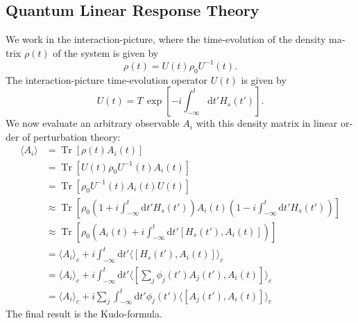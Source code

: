 \documentclass[master,       %
               twoside,        %
               BCOR10mm,       %
               english,ngerman, %
               ]{GAUBM}
\begin{document}
\begin{otherlanguage}{english}
\section{Quantum Linear Response Theory}
We work in the interaction-picture, where the time-evolution of the density matrix $\rho(t)$ of the system is given by
\begin{equation}
    \rho(t) = U(t) \rho_0 U^{-1}(t).
\end{equation}
The interaction-picture time-evolution operator $U(t)$ is given by
\begin{equation}
    U(t) = T \, \exp \left[ - i \int_{-\infty}^t  \mathrm{d} t' H_s(t') \right].
\end{equation}
We now evaluate an arbitrary observable $A_i$ with this density matrix in linear order of perturbation theory:
\begin{align}
	\label{eq:linear_response}
    \langle A_i \rangle &= \operatorname{Tr} \left[ \rho(t) A_i(t) \right] \nonumber \\
    &= \operatorname{Tr} \left[ U(t) \rho_0 U^{-1}(t) A_i(t) \right] \nonumber \\
    &= \operatorname{Tr} \left[ \rho_0 U^{-1}(t) A_i(t) U(t) \right] \nonumber \\
    &\approx \operatorname{Tr} \left[ \rho_0 (1 + i \int_{-\infty}^t \mathrm{d} t' H_s(t')) A_i(t) (1 - i \int_{-\infty}^t \mathrm{d} t' H_s(t')) \right] \nonumber \\
    &\approx \operatorname{Tr} \left[ \rho_0 (A_i(t) + i \int_{-\infty}^t \mathrm{d} t' [H_s(t'), A_i(t)] ) \right] \nonumber \\
    &= \langle A_i \rangle_c + i \int_{-\infty}^t \mathrm{d} t' \langle [H_s(t'), A_i(t)] \rangle_c \nonumber \\
    &= \langle A_i \rangle_c + i \int_{-\infty}^t \mathrm{d} t' \langle [\sum_j \phi_j(t') A_j(t'), A_i(t)] \rangle_c  \nonumber \\
    &= \langle A_i \rangle_c + i \sum_j \int_{-\infty}^t \mathrm{d} t' \phi_j(t') \langle [A_j(t'), A_i(t)] \rangle_c
\end{align}
The final result is the Kudo-formula.



\end{otherlanguage}
\end{document}
